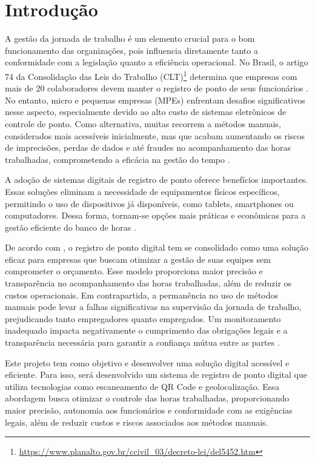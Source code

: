 \chapter{Introdução}

A gestão da jornada de trabalho é um elemento crucial para o bom funcionamento das organizações, pois influencia diretamente tanto a conformidade com a legislação quanto a eficiência operacional. No Brasil, o artigo 74 da Consolidação das Leis do Trabalho (CLT)\footnote{\url{https://www.planalto.gov.br/ccivil_03/decreto-lei/del5452.htm}} determina que empresas com mais de 20 colaboradores devem manter o registro de ponto de seus funcionários \cite{brasil1943}. No entanto, micro e pequenas empresas (MPEs) enfrentam desafios significativos nesse aspecto, especialmente devido ao alto custo de sistemas eletrônicos de controle de ponto. Como alternativa, muitas recorrem a métodos manuais, considerados mais acessíveis inicialmente, mas que acabam aumentando os riscos de imprecisões, perdas de dados e até fraudes no acompanhamento das horas trabalhadas, comprometendo a eficácia na gestão do tempo \cite{miranda2023}.

A adoção de sistemas digitais de registro de ponto oferece benefícios importantes. Essas soluções eliminam a necessidade de equipamentos físicos específicos, permitindo o uso de dispositivos já disponíveis, como tablets, smartphones ou computadores. Dessa forma, tornam-se opções mais práticas e econômicas para a gestão eficiente do banco de horas \cite{FlorindoBianchi2022}.
 
De acordo com \textcite{gomes2023}, o registro de ponto digital tem se consolidado como uma solução eficaz para empresas que buscam otimizar a gestão de suas equipes sem comprometer o orçamento. Esse modelo proporciona maior precisão e transparência no acompanhamento das horas trabalhadas, além de reduzir os custos operacionais. Em contrapartida, a permanência no uso de métodos manuais pode levar a falhas significativas na supervisão da jornada de trabalho, prejudicando tanto empregadores quanto empregados. Um monitoramento inadequado impacta negativamente o cumprimento das obrigações legais e a transparência necessária para garantir a confiança mútua entre as partes \cite{abreu2016sistema}.

Este projeto tem como objetivo e desenvolver uma solução digital acessível e eficiente. Para isso, será desenvolvido um sistema de registro de ponto digital que utiliza tecnologias como escaneamento de QR Code e geolocalização. Essa abordagem busca otimizar o controle das horas trabalhadas, proporcionando maior precisão, autonomia aos funcionários e conformidade com as exigências legais, além de reduzir custos e riscos associados aos métodos manuais. 

